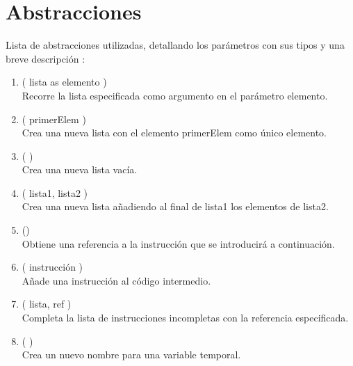 
\chapter{Abstracciones}

Lista de abstracciones utilizadas, detallando los parámetros con sus tipos y una breve 
descripción :

\begin{enumerate}
	\item {} ( lista as elemento ) \\
			Recorre la lista especificada como argumento en el parámetro elemento. \\
			
	\item {} ( primerElem ) \\
			Crea una nueva lista con el elemento primerElem como único elemento. \\
			
	\item {} ( ) \\
			Crea una nueva lista vacía. \\
			
	\item {} ( lista1, lista2 ) \\
			Crea una nueva lista añadiendo al final de lista1 los elementos de lista2. \\
			
	\item {} () \\
			Obtiene una referencia a la instrucción que se introducirá a continuación. \\
			
	\item {} ( instrucción ) \\
			Añade una instrucción al código intermedio. \\

	\item {} ( lista, ref ) \\
			Completa la lista de instrucciones incompletas con la referencia especificada. \\
			
	\item {} ( ) \\
			Crea un nuevo nombre para una variable temporal. \\
			
\end{enumerate}